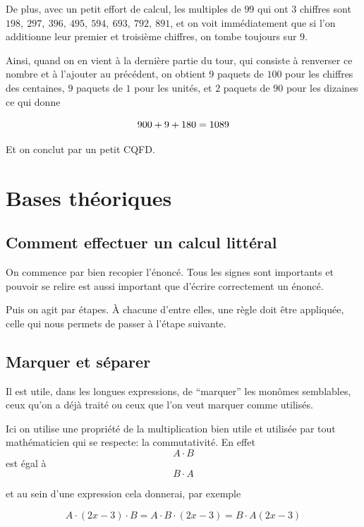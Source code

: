 \documentclass[
  12pt,
]{book}
\begin{document}
De plus, avec un petit effort de calcul, les multiples de \(99\) qui ont \(3\) chiffres sont \(198, ~297,~ 396, ~495, ~594, ~693, ~792, ~891\), et on voit immédiatement que si l'on additionne leur premier et troisième chiffres, on tombe toujours sur \(9\).

Ainsi, quand on en vient à la dernière partie du tour, qui consiste à renverser ce nombre et à l'ajouter au précédent, on obtient \(9\) paquets de \(100\) pour les chiffres des centaines, \(9\) paquets de \(1\) pour les unités, et \(2\) paquets de \(90\) pour les dizaines ce qui donne

\[\huge 900+9+180=1089\]

Et on conclut par un petit CQFD.

\hypertarget{bases-thuxe9oriques-2}{%
\section{Bases théoriques}\label{bases-thuxe9oriques-2}}

\hypertarget{comment-effectuer-un-calcul-littuxe9ral}{%
\subsection{Comment effectuer un calcul littéral}\label{comment-effectuer-un-calcul-littuxe9ral}}

On commence par bien recopier l'énoncé. Tous les signes sont importants et pouvoir se relire est aussi important que d'écrire correctement un énoncé.

Puis on agit par étapes. À chacune d'entre elles, une règle doit être appliquée, celle qui nous permets de passer à l'étape suivante.

\hypertarget{marquer-et-suxe9parer}{%
\subsection{Marquer et séparer}\label{marquer-et-suxe9parer}}

Il est utile, dans les longues expressions, de ``marquer'' les monômes semblables, ceux qu'on a déjà traité ou ceux que l'on veut marquer comme utilisés.

Ici on utilise une propriété de la multiplication bien utile et utilisée par tout mathématicien qui se respecte: la commutativité. En effet
\[A\cdot B\]
est égal à \[B\cdot A\]

et au sein d'une expression cela donnerai, par exemple

\[A\cdot(2x-3)\cdot B = A\cdot B\cdot(2x-3) = B\cdot A(2x-3)\]
\end{document}
